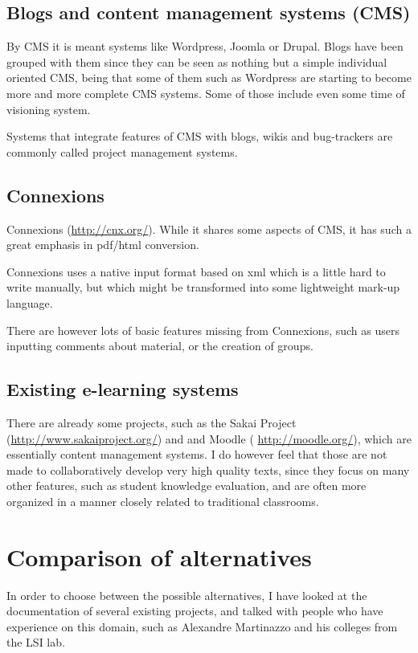 \documentclass[12pt]{article}
\begin{document}
\subsection{Blogs and content management systems (CMS)}

By CMS it is meant systems like Wordpress, Joomla or Drupal. Blogs have been grouped with them since they can be seen as nothing but a simple individual oriented CMS, being that some of them such as Wordpress are starting to become more and more complete CMS systems. Some of those include even some time of visioning system.

Systems that integrate features of CMS with blogs, wikis and bug-trackers are commonly called project management systems.

\subsection{Connexions}

Connexions (\url{http://cnx.org/}). While it shares some aspects of CMS, it has such a great emphasis in pdf/html conversion.

Connexions uses a native input format based on xml which is a little hard to write manually, but which might be transformed into some lightweight mark-up language.

There are however lots of basic features missing from Connexions, such as users inputting comments about material, or the creation of groups.

\subsection{Existing e-learning systems} \label{sec-learning-websites}

There are already some projects, such as the Sakai Project (\url{http://www.sakaiproject.org/}) and and Moodle (
\url{http://moodle.org/}), which are essentially content management systems. I do however feel that those are not made to collaboratively develop very high quality texts, since they focus on many other features, such as student knowledge evaluation, and are often more organized in a manner closely related to traditional classrooms.

\section{Comparison of alternatives}

In order to choose between the possible alternatives, I have looked at the documentation of several existing projects, and talked with people who have experience on this domain, such as Alexandre Martinazzo and his colleges from the LSI lab.
\end{document}

